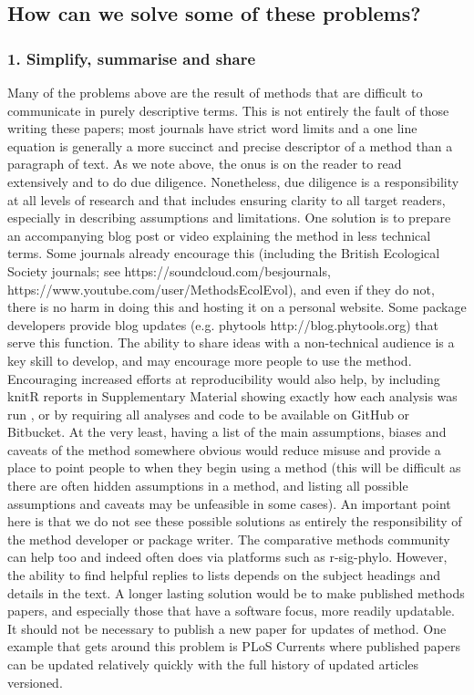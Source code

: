 \documentclass[a4paper,12pt]{article}
\begin{document}
\subsection{How can we solve some of these problems?}
  \subsubsection{1. Simplify, summarise and share}
    Many of the problems above are the result of methods that are difficult to communicate in purely descriptive terms.
    This is not entirely the fault of those writing these papers; most journals have strict word limits and a one line equation is generally a more succinct and precise descriptor of a method than a paragraph of text. 
    As we note above, the onus is on the reader to read extensively and to do due diligence.
    Nonetheless, due diligence is a responsibility at all levels of research and that includes ensuring clarity to all target readers, especially in describing assumptions and limitations.
    One solution is to prepare an accompanying blog post or video explaining the method in less technical terms. 
    Some journals already encourage this (including the British Ecological Society journals; see https://soundcloud.com/besjournals, https://www.youtube.com/user/MethodsEcolEvol), and even if they do not, there is no harm in doing this and hosting it on a personal website. 
    Some package developers provide blog updates (e.g. phytools http://blog.phytools.org) that serve this function. 
    The ability to share ideas with a non-technical audience is a key skill to develop, and may encourage more people to use the method.
    Encouraging increased efforts at reproducibility would also help, by including knitR \citep{Xie:2015aa} reports in Supplementary Material showing exactly how each analysis was run \citep[e.g.][]{fitzjohn2014much}, or by requiring all analyses and code to be available on GitHub or Bitbucket. 
    At the very least, having a list of the main assumptions, biases and caveats of the method somewhere obvious would reduce misuse and provide a place to point people to when they begin using a method (this will be difficult as there are often hidden assumptions in a method, and listing all possible assumptions and caveats may be unfeasible in some cases).
    An important point here is that we do not see these possible solutions as entirely the responsibility of the method developer or package writer. 
    The comparative methods community can help too and indeed often does via platforms such as r-sig-phylo.
    However, the ability to find helpful replies to lists depends on the subject headings and details in the text.
    A longer lasting solution would be to make published methods papers, and especially those that have a software focus, more readily updatable. 
    It should not be necessary to publish a new paper for updates of method.
    One example that gets around this problem is PLoS Currents where published papers can be updated relatively quickly with the full history of updated articles versioned.
    
\end{document}
